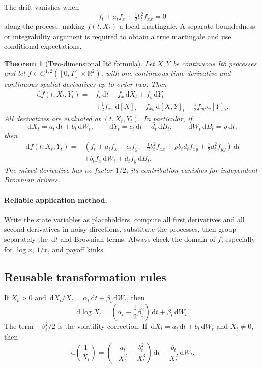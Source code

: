 \documentclass[11pt]{article}
\newcommand{\R}{\mathbb{R}}
\newcommand{\dd}{\,\mathrm{d}}
\newcommand{\1}{\mathbf{1}}
\theoremstyle{plain}
\newtheorem{theorem}{Theorem}[section]
\theoremstyle{definition}
\theoremstyle{remark}
\begin{document}
The drift vanishes when
\[
\boxed{f_t+a_tf_x+\tfrac12b_t^2f_{xx}=0}
\]
along the process, making \(f(t,X_t)\) a local martingale. A separate
boundedness or integrability argument is required to obtain a true
martingale and use conditional expectations.

\begin{theorem}[Two-dimensional It\^o formula]
Let \(X,Y\) be continuous It\^o processes and let
\(f\in C^{1,2}([0,T]\times\R^2)\), with one continuous time derivative
and continuous spatial derivatives up to order two. Then
\[
\boxed{
\begin{aligned}
\dd f(t,X_t,Y_t)={}&f_t\dd t+f_x\dd X_t+f_y\dd Y_t\\
&+\frac12f_{xx}\dd[X]_t+f_{xy}\dd[X,Y]_t
+\frac12f_{yy}\dd[Y]_t.
\end{aligned}}
\]
All derivatives are evaluated at \((t,X_t,Y_t)\).
In particular, if
\[
\dd X_t=a_t\dd t+b_t\dd W_t,
\qquad \dd Y_t=c_t\dd t+d_t\dd B_t,
\qquad \dd W_t\dd B_t=\rho\dd t,
\]
then
\[
\boxed{
\begin{aligned}
\dd f(t,X_t,Y_t)
={}&\left(f_t+a_tf_x+c_tf_y+\tfrac12b_t^2f_{xx}
       +\rho b_td_tf_{xy}+\tfrac12d_t^2f_{yy}\right)\dd t\\
&+b_tf_x\dd W_t+d_tf_y\dd B_t.
\end{aligned}}
\]
The mixed derivative has no factor \(1/2\); its contribution vanishes
for independent Brownian drivers.
\end{theorem}

\paragraph{Reliable application method.}
Write the state variables as placeholders, compute all first derivatives and
all second derivatives in noisy directions, substitute the processes, then
group separately the \(\dd t\) and Brownian terms. Always check the domain
of \(f\), especially for \(\log x\), \(1/x\), and payoff kinks.

\subsection{Reusable transformation rules}

If \(X_t>0\) and
\(\dd X_t/X_t=\alpha_t\dd t+\beta_t\dd W_t\), then
\[
\boxed{
\dd\log X_t
=\left(\alpha_t-\frac12\beta_t^2\right)\dd t
+\beta_t\dd W_t.}
\]
The term \(-\beta_t^2/2\) is the volatility correction. If
\(\dd X_t=a_t\dd t+b_t\dd W_t\) and \(X_t\neq0\), then
\[
\boxed{
\dd\left(\frac1{X_t}\right)
=\left(-\frac{a_t}{X_t^2}+\frac{b_t^2}{X_t^3}\right)\dd t
-\frac{b_t}{X_t^2}\dd W_t.}
\]
\end{document}
